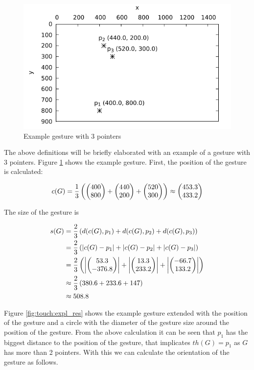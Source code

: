 \begin{figure}
	\caption{\label{fig:touch:expl}Example gesture with 3 pointers}
	\begin{center}
		\includegraphics{assets/chpt_concepts/gestures/3pointers_blank.pdf}
	\end{center}
\end{figure}

The above definitions will be briefly elaborated with an example of a gesture with 3 pointers. Figure \ref{fig:touch:expl} shows the example gesture. First, the position of the gesture is calculated:

\begin{equation*}
c(G) = \frac{1}{3}\left( \left( \begin{matrix} 400 \\ 800 \end{matrix} \right) + \left( \begin{matrix} 440 \\ 200 \end{matrix} \right) + \left( \begin{matrix} 520 \\ 300 \end{matrix} \right) \right) \approx \left( \begin{matrix} 453.3 \\ 433.2 \end{matrix} \right)
\end{equation*}

The size of the gesture is

\begin{align*}
s(G) &= \frac{2}{3}\left( d(c(G), p_1) + d(c(G), p_2) + d(c(G), p_3) \right) \\
&= \frac{2}{3}\left( \left|c(G) - p_1\right| + \left| c(G) - p_2 \right| + \left| c(G) - p_3 \right| \right) \\
&= \frac{2}{3}\left( \left| \left( \begin{matrix} 53.3 \\ -376.8 \end{matrix} \right) \right| + \left| \left( \begin{matrix} 13.3 \\ 233.2 \end{matrix} \right) \right| + \left| \left( \begin{matrix} -66.7 \\ 133.2 \end{matrix} \right) \right| \right)	\\
&\approx \frac{2}{3}\left( 380.6 + 233.6 + 147 \right)\\
&\approx 508.8
\end{align*}

Figure \ref{fig:touch:expl_res} shows the example gesture extended with the position of the gesture and a circle with the diameter of the gesture size around the position of the gesture. From the above calculation it can be seen that $p_1$ has the biggest distance to the position of the gesture, that implicates $th(G) = p_1$ as $G$ has more than 2 pointers. With this we can calculate the orientation of the gesture as follows.

